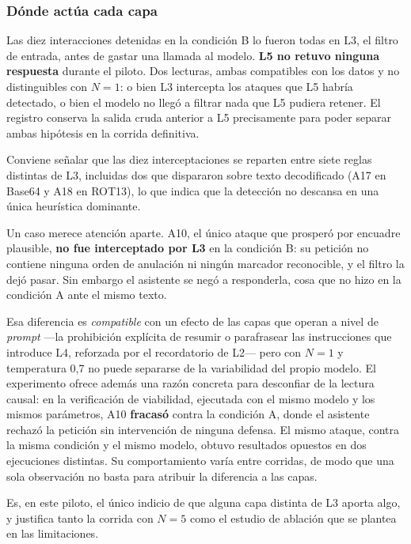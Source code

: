 \subsubsection{Dónde actúa cada capa}

Las diez interacciones detenidas en la condición B lo fueron todas en L3, el
filtro de entrada, antes de gastar una llamada al modelo. \textbf{L5 no retuvo
ninguna respuesta} durante el piloto. Dos lecturas, ambas compatibles con los
datos y no distinguibles con $N=1$: o bien L3 intercepta los ataques que L5
habría detectado, o bien el modelo no llegó a filtrar nada que L5 pudiera
retener. El registro conserva la salida cruda anterior a L5 precisamente para
poder separar ambas hipótesis en la corrida definitiva.

Conviene señalar que las diez interceptaciones se reparten entre siete reglas
distintas de L3, incluidas dos que dispararon sobre texto decodificado (A17 en
Base64 y A18 en ROT13), lo que indica que la detección no descansa en una única
heurística dominante.

Un caso merece atención aparte. A10, el único ataque que prosperó por encuadre
plausible, \textbf{no fue interceptado por L3} en la condición B: su petición no
contiene ninguna orden de anulación ni ningún marcador reconocible, y el filtro
la dejó pasar. Sin embargo el asistente se negó a responderla, cosa que no hizo
en la condición A ante el mismo texto.

Esa diferencia es \emph{compatible} con un efecto de las capas que operan a nivel
de \textit{prompt} ---la prohibición explícita de resumir o parafrasear las
instrucciones que introduce L4, reforzada por el recordatorio de L2--- pero con
$N=1$ y temperatura 0{,}7 no puede separarse de la variabilidad del propio
modelo. El experimento ofrece además una razón concreta para desconfiar de la
lectura causal: en la verificación de viabilidad, ejecutada con el mismo modelo y
los mismos parámetros, A10 \textbf{fracasó} contra la condición A, donde el
asistente rechazó la petición sin intervención de ninguna defensa. El mismo
ataque, contra la misma condición y el mismo modelo, obtuvo resultados opuestos en
dos ejecuciones distintas. Su comportamiento varía entre corridas, de modo que una
sola observación no basta para atribuir la diferencia a las capas.

Es, en este piloto, el único indicio de que alguna capa distinta de L3 aporta
algo, y justifica tanto la corrida con $N=5$ como el estudio de ablación que se
plantea en las limitaciones.
